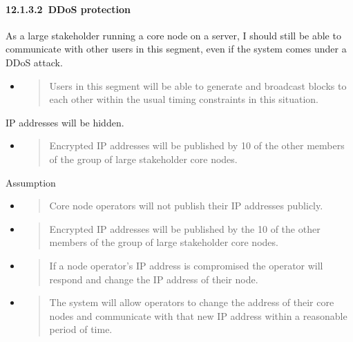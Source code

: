 \documentclass[11pt,a4paper]{article}
\begin{document}
\hypertarget{ddos-protection}{%
\paragraph{​12.1.3.2​~DDoS protection}\label{ddos-protection}}

As a large stakeholder running a core node on a server, I should still
be able to communicate with other users in this segment, even if the
system comes under a DDoS attack.

\begin{itemize}
\item
  \begin{quote}
  Users in this segment will be able to generate and broadcast blocks to
  each other within the usual timing constraints in this situation.
  \end{quote}
\end{itemize}

IP addresses will be hidden.

\begin{itemize}
\item
  \begin{quote}
  Encrypted IP addresses will be published by 10 of the other members of
  the group of large stakeholder core nodes.
  \end{quote}
\end{itemize}

Assumption

\begin{itemize}
\item
  \begin{quote}
  Core node operators will not publish their IP addresses publicly.
  \end{quote}
\item
  \begin{quote}
  Encrypted IP addresses will be published by the 10 of the other
  members of the group of large stakeholder core nodes.
  \end{quote}
\item
  \begin{quote}
  If a node operator's IP address is compromised the operator will
  respond and change the IP address of their node.
  \end{quote}
\item
  \begin{quote}
  The system will allow operators to change the address of their core
  nodes and communicate with that new IP address within a reasonable
  period of time.
  \end{quote}
\end{itemize}
\end{document}
